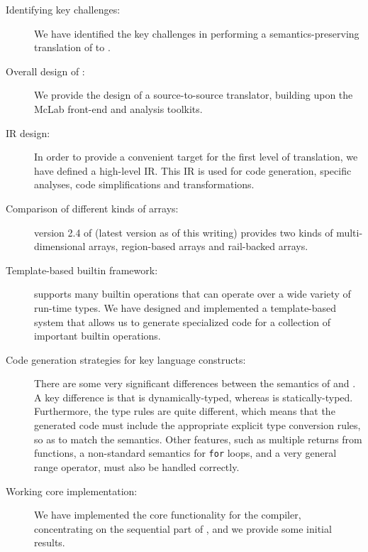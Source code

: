 \begin{description}

\item[Identifying key challenges:] We have identified the key challenges
in performing a semantics-preserving translation of \matlab to \xten.

\item[Overall design of \mixten:] We provide the design of a 
source-to-source translator, building upon the McLab front-end and
analysis toolkits.

\item[\mixten IR design:] In order to provide a convenient
target for the first level of translation, we have defined a high-level
\mixten IR.  This IR is used for code generation, \xten specific analyses, 
code simplifications and transformations.

\item[Comparison of different kinds of \xten arrays:] version 2.4 of \xten 
(latest version as of this writing) provides two kinds of multi-dimensional 
arrays, region-based arrays and rail-backed arrays.  

\item[Template-based builtin framework:] \matlab supports many builtin
operations that can operate over a wide variety of run-time types.  We
have designed and implemented a template-based system that allows us to
generate specialized \xten code for a collection of important builtin
operations.

\item[Code generation strategies for key language constructs:]  There
are some very significant differences between the semantics of \matlab
and \xten.  A key difference is that \matlab is dynamically-typed,
whereas \xten is statically-typed.   Furthermore, the type rules are
quite different, which means that the generated \xten code must include
the appropriate explicit type conversion rules, so as to match the
\matlab semantics.   Other \matlab features, such as multiple returns
from functions, a non-standard semantics for \texttt{for} loops, and a
very general range operator, must also be handled correctly.

\item[Working core implementation:] We have implemented the core
functionality for the \mixten compiler, concentrating on the sequential
part of \xten, and we provide some initial results.

\end{description}
